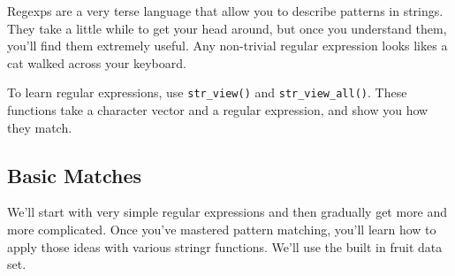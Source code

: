 \documentclass[]{book}
\let\BeginKnitrBlock\begin \let\EndKnitrBlock\end
\begin{document}
Regexps are a very terse language that allow you to describe patterns in
strings. They take a little while to get your head around, but once you
understand them, you'll find them extremely useful. Any non-trivial
regular expression looks likes a cat walked across your keyboard.

\BeginKnitrBlock{rmdtip}
To learn regular expressions, use \texttt{str\_view()} and
\texttt{str\_view\_all()}. These functions take a character vector and a
regular expression, and show you how they match.
\EndKnitrBlock{rmdtip}

\subsection{Basic Matches}\label{basic-matches}

We'll start with very simple regular expressions and then gradually get
more and more complicated. Once you've mastered pattern matching, you'll
learn how to apply those ideas with various stringr functions. We'll use
the built in fruit data set.
\end{document}
